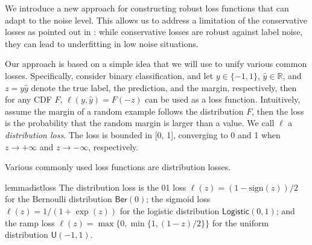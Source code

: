 \documentclass[letterpaper]{article} %
\newcommand{\R}{{\mathbb{R}}}
\newcommand{\ber}{{\mathsf{Ber}}}
\begin{document}
We introduce a new approach for constructing robust loss functions that can
adapt to the noise level.
This allows us to address a limitation of the conservative losses as pointed out
in : 
while conservative losses are robust against label noise, they can lead to
underfitting in low noise situations.



Our approach is based on a simple idea that we will use to unify various common
losses.
Specifically, consider binary classification, and let 
$y \in \{-1, 1\}$, 
$\widehat{y} \in \R$, 
and 
$z = y\widehat{y}$ 
denote the true label, the prediction, and the margin,
respectively, then for any CDF $F$, 
$\ell(y, \widehat{y}) = F(-z)$ can be used as a loss function.
Intuitively, assume the margin of a random example follows the distribution $F$,
then the loss is the probability that the random margin is larger than a value.
We call $\ell$ a \emph{distribution loss}.
The loss is bounded in [0, 1], 
converging
to 0 and 1 when $z \to +\infty$
and $z \to -\infty$, respectively.

Various commonly used loss functions are distribution losses.

\begin{restatable}{lemma}{distloss}
    \label{lem:distloss}
	The distribution loss is
	the 01 loss $\ell(z)=(1-\mathrm{sign}(z))/2$ 
	for the Bernoulli distribution $\ber(0)$;
	the sigmoid loss $\ell(z)=1/(1+\exp(z))$ 
	for the logistic distribution $\mathsf{Logistic}(0,1)$;
	and the ramp loss $\ell(z)=\max\{0,\min\{1,(1-z)/2\}\}$ 
	for the uniform distribution $\mathsf{U}(-1,1)$.
\end{restatable}
\end{document}
